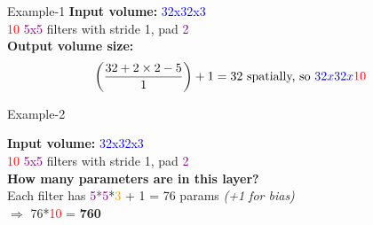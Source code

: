 \documentclass[default, aspectratio=169]{beamer}
\begin{document}
	\begin{frame}{Example-1}
		\textbf{Input volume:} \textcolor{blue}{32x32x3}\\
		\textcolor{red}{10} \textcolor{purple}{5x5} filters with stride \textcolor{deepgreen}{1}, pad \textcolor{purple}{2}\\[10pt]
		
		\textbf{Output volume size:}\\
		\[
		\left(\frac{32 + 2 \times 2 - 5}{1}\right) + 1 = 32 \text{ spatially, so} \ \textcolor{blue}{32x32x}\textcolor{red}{10}
		\]
	\end{frame}
	\begin{frame}{Example-2}
		
		\textbf{Input volume:} \textcolor{blue}{32x32x3}\\
		\textcolor{red}{10} \textcolor{purple}{5x5} filters with stride \textcolor{deepgreen}{1}, pad \textcolor{purple}{2}\\[10pt]
		
		\textbf{How many parameters are in this layer?}\\
		Each filter has \textcolor{purple}{5*5}*\textcolor{orange}{3} + 1 = \textcolor{deepgreen}{76} params \hspace{5pt} \textit{(+1 for bias)}\\
		$\Rightarrow$ \textcolor{deepgreen}{76}*\textcolor{red}{10} = \textbf{760}
	\end{frame}
\end{document}
